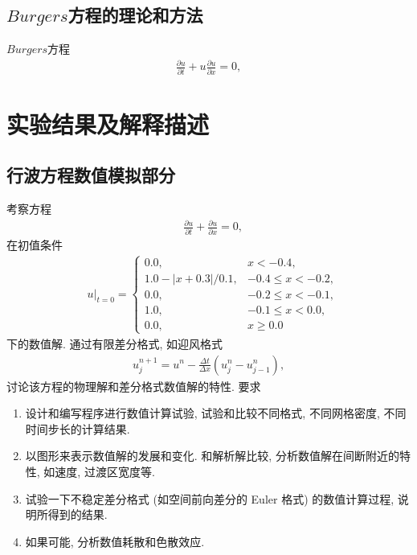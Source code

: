 \documentclass[10.5pt
]{article}
\begin{document}
\subsection{$Burgers$方程的理论和方法}
$Burgers$方程
\begin{align}
\frac{\partial u}{\partial t} + u \frac{\partial u}{\partial x} = 0, \label{EqnBurgers}
\end{align}


\section{实验结果及解释描述}
\subsection{行波方程数值模拟部分}
考察方程
\begin{align}
& \frac{\partial u}{\partial t} + \frac{\partial u}{\partial x} = 0,
\label{EqnCon}
\end{align}
在初值条件
\begin{align}
& u|_{t=0} = \left\{\begin{array}{ll} 0.0, & x < -0.4, \\
1.0 - |x + 0.3| / 0.1, & -0.4 \le x < -0.2, \\
0.0, & -0.2 \le x < -0.1, \\
1.0 , & -0.1 \le x < 0.0, \\
0.0, & x \ge 0.0
\end{array}\right.
\end{align}
下的数值解. 通过有限差分格式, 如迎风格式
\begin{align}
u_j^{n+1} = u^n - \frac{\Delta t}{\Delta x} (u_j^n - u_{j-1}^n), \label{EqnUpwind}
\end{align}
讨论该方程的物理解和差分格式数值解的特性. 要求
\begin{enumerate}
\item
  设计和编写程序进行数值计算试验, 试验和比较不同格式, 不同网格密度, 不同时间步长的计算结果.
\item
  以图形来表示数值解的发展和变化. 和解析解比较, 分析数值解在间断附近的特性, 如速度, 过渡区宽度等.
\item
  试验一下不稳定差分格式 (如空间前向差分的 Euler 格式) 的数值计算过程, 说明所得到的结果.
\item
  如果可能, 分析数值耗散和色散效应.
\end{enumerate}
\end{document}

